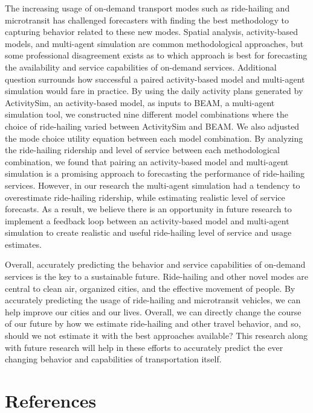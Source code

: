 \documentclass[fancy, masters]{byuthesis}
\begin{document}
The increasing usage of on-demand transport modes such as ride-hailing and microtransit has challenged forecasters with finding the best methodology to capturing behavior related to these new modes. Spatial analysis, activity-based models, and multi-agent simulation are common methodological approaches, but some professional disagreement exists as to which approach is best for forecasting the availability and service capabilities of on-demand services. Additional question surrounds how successful a paired activity-based model and multi-agent simulation would fare in practice. By using the daily activity plans generated by ActivitySim, an activity-based model, as inputs to BEAM, a multi-agent simulation tool, we constructed nine different model combinations where the choice of ride-hailing varied between ActivitySim and BEAM. We also adjusted the mode choice utility equation between each model combination. By analyzing the ride-hailing ridership and level of service between each methodological combination, we found that pairing an activity-based model and multi-agent simulation is a promising approach to forecasting the performance of ride-hailing services. However, in our research the multi-agent simulation had a tendency to overestimate ride-hailing ridership, while estimating realistic level of service forecasts. As a result, we believe there is an opportunity in future research to implement a feedback loop between an activity-based model and multi-agent simulation to create realistic and useful ride-hailing level of service and usage estimates.

Overall, accurately predicting the behavior and service capabilities of on-demand services is the key to a sustainable future. Ride-hailing and other novel modes are central to clean air, organized cities, and the effective movement of people. By accurately predicting the usage of ride-hailing and microtransit vehicles, we can help improve our cities and our lives. Overall, we can directly change the course of our future by how we estimate ride-hailing and other travel behavior, and so, should we not estimate it with the best approaches available? This research along with future research will help in these efforts to accurately predict the ever changing behavior and capabilities of transportation itself.

\nocite{*}

\hypertarget{references}{%
\chapter*{References}\label{references}}
\end{document}
